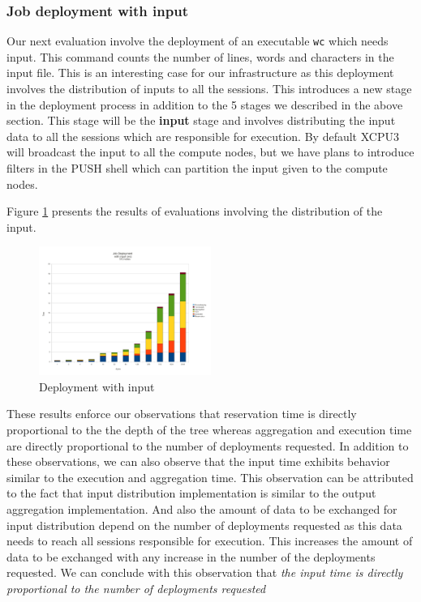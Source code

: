 \documentclass[conference]{IEEEtran}
\begin{document}
\subsubsection{Job deployment with input}
Our next evaluation involve the deployment of an executable \texttt{wc} which
needs input. This command counts the number of lines, words and characters in
the input file.  This is an interesting case for our infrastructure as this
deployment involves the distribution of inputs to all the sessions.  This
introduces a new stage in the deployment process in addition to the 5 stages we
described in the above section.  This stage will be the \textbf{input} stage and
involves distributing the input data to all the sessions which are responsible
for execution.  By default XCPU3 will broadcast the input to all the compute
nodes, but we have plans to introduce filters in the PUSH shell which can
partition the input given to the compute  nodes. 

Figure \ref{fig:wc_graph} presents the results of evaluations involving the
distribution of the input.


\begin{figure}[h]
  \begin{center}
    \leavevmode
      \includegraphics[height=0.2\textheight,width=0.5\textwidth]
		{./img/wc_graph}
    \caption{Deployment with input}
    \label{fig:wc_graph}
  \end{center}
\end{figure}

These results enforce our observations that reservation time is directly
proportional to the the depth of the tree whereas aggregation and execution time
are directly proportional to the number of deployments requested.  In addition
to these observations, we can also observe that the input time exhibits 
behavior similar to the execution and aggregation time.  This observation can be
attributed to the fact that input distribution implementation is similar
to the output aggregation implementation.  And also the amount of data to be
exchanged for input distribution depend on the number of deployments requested
as this data needs to reach all sessions responsible for execution.  This
increases the amount of data to be exchanged with any increase in the number of
the deployments requested.  We can conclude with this observation that
\textit{the input time is directly proportional to the number of deployments
requested}
\end{document}
